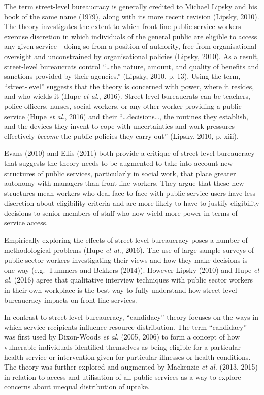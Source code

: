 \documentclass[12pt,a4paper,oneside,table]{report}
\begin{document}
The term street-level bureaucracy is generally credited to Michael
Lipsky and his book of the same name (1979), along with its more recent
revision (Lipsky, 2010). The theory investigates the extent to which
front-line public service workers exercise discretion in which
individuals of the general public are eligible to access any given
service - doing so from a position of authority, free from
organisational oversight and unconstrained by organisational policies
(Lipsky, 2010). As a result, street-level bureaucrats control
``\ldots{}the nature, amount, and quality of benefits and sanctions
provided by their agencies.'' (Lipsky, 2010, p. 13). Using the term,
``street-level'' suggests that the theory is concerned with power, where
it resides, and who wields it (Hupe \emph{et al.}, 2016). Street-level
bureaucrats can be teachers, police officers, nurses, social workers, or
any other worker providing a public service (Hupe \emph{et al.}, 2016)
and their ``\ldots{}decisions\ldots{}, the routines they establish, and
the devices they invent to cope with uncertainties and work pressures
effectively \textit{become} the public policies they carry out''
(Lipsky, 2010, p. xiii).

Evans (2010) and Ellis (2011) both provide a critique of street-level
bureaucracy that suggests the theory needs to be augmented to take into
account new structures of public services, particularly in social work,
that place greater autonomy with managers than front-line workers. They
argue that these new structures mean workers who deal face-to-face with
public service users have less discretion about eligibility criteria and
are more likely to have to justify eligibility decisions to senior
members of staff who now wield more power in terms of service access.

Empirically exploring the effects of street-level bureaucracy poses a
number of methodological problems (Hupe \emph{et al.}, 2016). The use of
large sample surveys of public sector workers investigating their views
and how they make decisions is one way (e.g.~Tummers and Bekkers
(2014)). However Lipsky (2010) and Hupe \textit{et al.} (2016) agree
that qualitative interview techniques with public sector workers in
their own workplace is the best way to fully understand how street-level
bureaucracy impacts on front-line services.

In contrast to street-level bureaucracy, ``candidacy'' theory focuses on
the ways in which service recipients influence resource distribution.
The term ``candidacy'' was first used by Dixon-Woods \textit{et al.}
(2005, 2006) to form a concept of how vulnerable individuals identified
themselves as being eligible for a particular health service or
intervention given for particular illnesses or health conditions. The
theory was further explored and augmented by Mackenzie \textit{et al.}
(2013, 2015) in relation to access and utilisation of all public
services as a way to explore concerns about unequal distribution of
uptake.
\end{document}
